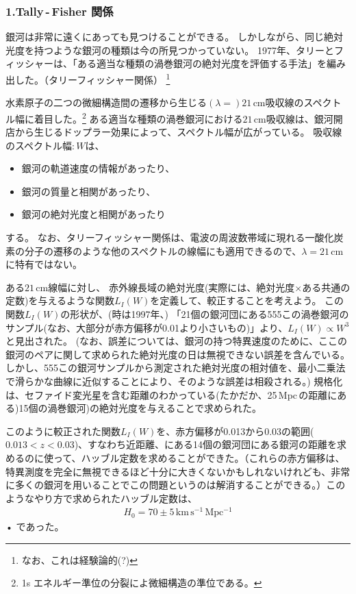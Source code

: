 \documentclass[12pt,a4paper]{article}
\theoremstyle{plain}
\theoremstyle{break}
\begin{document}
\subsubsection*{1.Tally\,-\,Fisher 関係}
銀河は非常に遠くにあっても見つけることができる。
しかしながら、同じ絶対光度を持つような銀河の種類は今の所見つかっていない。
1977年、タリーとフィッシャーは、「ある適当な種類の渦巻銀河の絶対光度を評価する手法」を編み出した。（タリーフィッシャー関係）
\footnote{なお、これは経験論的(?)}

水素原子の二つの微細構造間の遷移から生じる$(\lambda = ) 21\,\mathrm{cm}$吸収線のスペクトル幅に着目した。\footnote{1s エネルギー準位の分裂によ微細構造の準位である。}
ある適当な種類の渦巻銀河における$21\,\mathrm{cm}$吸収線は、銀河開店から生じるドップラー効果によって、スペクトル幅が広がっている。
吸収線のスペクトル幅$:W$は、
\begin{itemize}
  \item 銀河の軌道速度の情報があったり、
  \item 銀河の質量と相関があったり、
  \item 銀河の絶対光度と相関があったり
\end{itemize}
する。
なお、タリーフィッシャー関係は、電波の周波数帯域に現れる一酸化炭素の分子の遷移のような他のスペクトルの線幅にも適用できるので、$\lambda = 21 \, \mathrm{cm}$に特有ではない。
\begin{flushleft}
\end{flushleft}
ある$21 \, \mathrm{cm}$線幅に対し、
赤外線長域の絶対光度(実際には、絶対光度$\times$ある共通の定数)を与えるような関数$L_I(W)$を定義して、較正することを考えよう。
この関数$L_I(W)$の形状が、(時は1997年、)
「21個の銀河団にある555この渦巻銀河のサンプル(なお、大部分が赤方偏移が0.01より小さいもの)」より、$L_I(W) \propto W^3$と見出された。
(なお、誤差については、銀河の持つ特異速度のために、ここの銀河のペアに関して求められた絶対光度の日は無視できない誤差を含んでいる。
しかし、555この銀河サンプルから測定された絶対光度の相対値を、最小二乗法で滑らかな曲線に近似することにより、そのような誤差は相殺される。)
規格化は、セファイド変光星を含む距離のわかっている(たかだか、25\,Mpc\,の距離にある)15個の渦巻銀河)の絶対光度を与えることで求められた。

このように較正された関数$L_I(W)$を、赤方偏移が0.013から0.03の範囲($0.013<z<0.03$)、すなわち近距離、にある14個の銀河団にある銀河の距離を求めるのに使って、ハッブル定数を求めることができた。（これらの赤方偏移は、特異測度を完全に無視できるほど十分に大きくないかもしれないけれども、非常に多くの銀河を用いることでこの問題というのは解消することができる。）このようなやり方で求められたハッブル定数は、
\begin{align}
 H_0 = 70 \pm5 \,\mathrm{km\,s^{-1}\,Mpc^{-1}}
\end{align}•%
であった。
\end{document}
